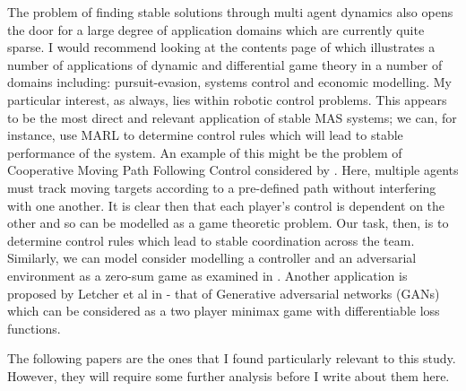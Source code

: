 \documentclass[preprint,8pt]{report}
\begin{document}
The problem of finding stable solutions through multi agent dynamics also opens the door for a large degree of application domains which are currently quite sparse. I would recommend looking at the contents page of \cite{Hamalainen1991DifferentialFinland} which illustrates a number of applications of dynamic and differential game theory in a number of domains including: pursuit-evasion, systems control and economic modelling. My particular interest, as always, lies within robotic control problems. This appears to be the most direct and relevant application of stable MAS systems; we can, for instance, use MARL to determine control rules which will lead to stable performance of the system. An example of this might be the problem of Cooperative Moving Path Following Control considered by \cite{Reis2019RobustVehicles}. Here, multiple agents must track moving targets according to a pre-defined path without interfering with one another. It is clear then that each player's control is dependent on the other and so can be modelled as a game theoretic problem. Our task, then, is to determine control rules which lead to stable coordination across the team. Similarly, we can model consider modelling a controller and an adversarial environment as a zero-sum game as examined in \cite{Marden2018AnnualControl}. Another application is proposed by Letcher et al in \cite{Letcher2019DifferentiableMechanics} - that of Generative adversarial networks (GANs) which can be considered as a two player minimax game with differentiable loss functions. 

The following papers \cite{Bailey2019FiniteDescent-Ascent, Bailey2019Multi-AgentSystem, Boone2019FromTheory, DickensTheLearning, Berkenkamp2017SafeGuarantees, Jin2018Stability-certifiedPerspective, Letcher2019DifferentiableMechanics} are the ones that I found particularly relevant to this study. However, they will require some further analysis before I write about them here.




\end{document}
